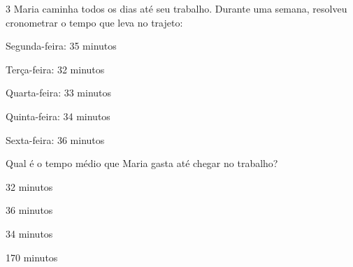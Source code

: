






\num{3} Maria caminha todos os dias até seu trabalho. Durante uma semana,
resolveu cronometrar o tempo que leva no trajeto:

Segunda-feira: 35 minutos

Terça-feira: 32 minutos

Quarta-feira: 33 minutos

Quinta-feira: 34 minutos

Sexta-feira: 36 minutos

Qual é o tempo médio que Maria gasta até chegar no trabalho?
\item 32 minutos
\item 36 minutos
\item 34 minutos
\item 170 minutos








